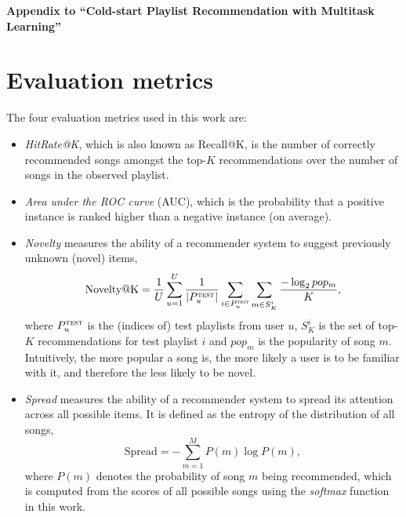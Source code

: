 \appendix
\begin{center}
  {\Large\bf Appendix to ``Cold-start Playlist Recommendation with Multitask Learning''}
\end{center}
\rule{0pt}{50pt}





\clearpage
\newpage

\section{Evaluation metrics}
The four evaluation metrics used in this work are:
\begin{itemize}
\item \emph{HitRate@K}, which is also known as Recall@K, is the number of correctly recommended songs amongst the top-$K$ recommendations over
      the number of songs in the observed playlist.
\item \emph{Area under the ROC curve} (AUC), which is the probability that a positive instance is ranked higher than a negative instance (on average).
\item \emph{Novelty} measures the ability of a recommender system to suggest previously unknown (\ie novel) items,
      $$
      \text{Novelty@K} 
      = \frac{1}{U} \sum_{u=1}^U \frac{1}{|P_u^\textsc{test}|} \sum_{i \in P_u^\textsc{test}} \sum_{m \in S_K^i} 
        \frac{-\log_2 pop_m}{K},
      $$
      where $P_u^\textsc{test}$ is the (indices of) test playlists from user $u$, 
      $S_K^i$ is the set of top-$K$ recommendations for test playlist $i$ and $pop_m$ is the popularity of song $m$.
      Intuitively, the more popular a song is, the more likely a user is to be familiar with it, and therefore the less likely to be novel.
\item \emph{Spread} measures the ability of a recommender system to spread its attention across all possible items.
      It is defined as the entropy of the distribution of all songs,
      $$
      \text{Spread} = -\sum_{m=1}^M P(m) \log P(m),
      $$
      where $P(m)$ denotes the probability of song $m$ being recommended,
      which is computed from the scores of all possible songs using the \emph{softmax} function in this work.
\end{itemize}


\clearpage
\newpage
\twocolumn

